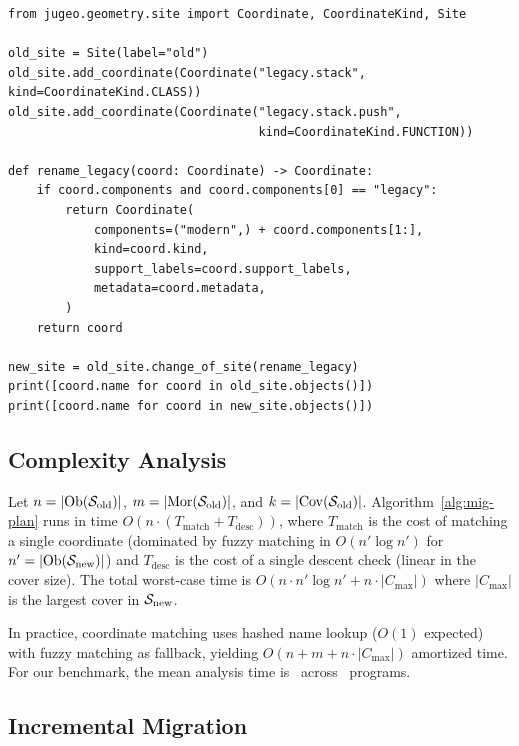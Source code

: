 \documentclass[11pt]{article}
\newcommand{\MigPlan}{\textsc{MigrationPlan}}
\newcommand{\SiteOld}{\Site_{\mathrm{old}}}
\newcommand{\SiteNew}{\Site_{\mathrm{new}}}
\begin{document}
\begin{lstlisting}[style=jugeo-python]
from jugeo.geometry.site import Coordinate, CoordinateKind, Site

old_site = Site(label="old")
old_site.add_coordinate(Coordinate("legacy.stack", kind=CoordinateKind.CLASS))
old_site.add_coordinate(Coordinate("legacy.stack.push",
                                   kind=CoordinateKind.FUNCTION))

def rename_legacy(coord: Coordinate) -> Coordinate:
    if coord.components and coord.components[0] == "legacy":
        return Coordinate(
            components=("modern",) + coord.components[1:],
            kind=coord.kind,
            support_labels=coord.support_labels,
            metadata=coord.metadata,
        )
    return coord

new_site = old_site.change_of_site(rename_legacy)
print([coord.name for coord in old_site.objects()])
print([coord.name for coord in new_site.objects()])
\end{lstlisting}

\subsection{Complexity Analysis}\label{sec:complexity}

\begin{proposition}[Complexity of \MigPlan]\label{prop:complexity}
Let $n = |\Ob(\SiteOld)|$, $m = |\Mor(\SiteOld)|$, and
$k = |\Cov(\SiteOld)|$.  Algorithm~\ref{alg:mig-plan} runs in time
$O(n \cdot (T_{\mathrm{match}} + T_{\mathrm{desc}}))$, where
$T_{\mathrm{match}}$ is the cost of matching a single coordinate (dominated
by fuzzy matching in $O(n' \log n')$ for $n' = |\Ob(\SiteNew)|$) and
$T_{\mathrm{desc}}$ is the cost of a single descent check (linear in the
cover size).  The total worst-case time is $O(n \cdot n' \log n' + n \cdot
|C_{\max}|)$ where $|C_{\max}|$ is the largest cover in $\SiteNew$.
\end{proposition}

In practice, coordinate matching uses hashed name lookup ($O(1)$ expected)
with fuzzy matching as fallback, yielding $O(n + m + n \cdot |C_{\max}|)$
amortized time.  For our benchmark, the mean analysis time is
\compTimeMean\ across \compTotalPrograms\ programs.

\subsection{Incremental Migration}\label{sec:incremental}
\end{document}
